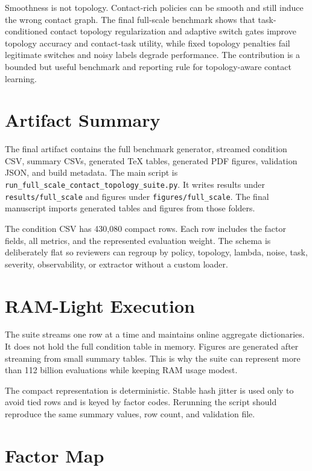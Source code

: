 \documentclass{article}
\begin{document}
Smoothness is not topology. Contact-rich policies can be smooth and still induce the wrong contact graph. The final full-scale benchmark shows that task-conditioned contact topology regularization and adaptive switch gates improve topology accuracy and contact-task utility, while fixed topology penalties fail legitimate switches and noisy labels degrade performance. The contribution is a bounded but useful benchmark and reporting rule for topology-aware contact learning.

\clearpage
\appendix
\renewcommand{\thesection}{A.\arabic{section}}
\setcounter{section}{0}

\section{Artifact Summary}

The final artifact contains the full benchmark generator, streamed condition CSV, summary CSVs, generated TeX tables, generated PDF figures, validation JSON, and build metadata. The main script is \texttt{run\_full\_scale\_contact\_topology\_suite.py}. It writes results under \texttt{results/full\_scale} and figures under \texttt{figures/full\_scale}. The final manuscript imports generated tables and figures from those folders.

The condition CSV has 430,080 compact rows. Each row includes the factor fields, all metrics, and the represented evaluation weight. The schema is deliberately flat so reviewers can regroup by policy, topology, lambda, noise, task, severity, observability, or extractor without a custom loader.

\section{RAM-Light Execution}

The suite streams one row at a time and maintains online aggregate dictionaries. It does not hold the full condition table in memory. Figures are generated after streaming from small summary tables. This is why the suite can represent more than 112 billion evaluations while keeping RAM usage modest.

The compact representation is deterministic. Stable hash jitter is used only to avoid tied rows and is keyed by factor codes. Rerunning the script should reproduce the same summary values, row count, and validation file.

\section{Factor Map}
\end{document}
